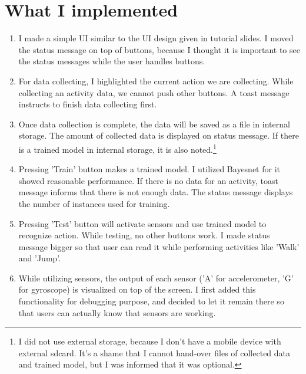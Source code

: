 \documentclass[11pt,a4paper]{article}
\begin{document}
	\section {What I implemented}
	\begin{enumerate}
		\item I made a simple UI similar to the UI design given in tutorial slides. I moved the status message on top of buttons, because I thought it is important to see the status messages while the user handles buttons. 
		
		\item For data collecting, I highlighted the current action we are collecting. While collecting an activity data, we cannot push other buttons. A toast message instructs to finish data collecting first.
		
		\item Once data collection is complete, the data will be saved as a file in internal storage. The amount of collected data is displayed on status message. If there is a trained model in internal storage, it is also noted.\footnote{I did not use external storage, because I don't have a mobile device with external sdcard. It's a shame that I cannot hand-over files of collected data and trained model, but I was informed that it was optional.}
		
		\item Pressing 'Train' button makes a trained model. I utilized Bayesnet for it showed reasonable performance. If there is no data for an activity, toast message informs that there is not enough data. The status message displays the number of instances used for training.
		
		\item Pressing 'Test' button will activate sensors and use trained model to recognize action. While testing, no other buttons work. I made status message bigger so that user can read it while performing activities like 'Walk' and 'Jump'.
		
		\item While utilizing sensors, the output of each sensor ('A' for accelerometer, 'G' for gyroscope) is visualized on top of the screen. I first added this functionality for debugging purpose, and decided to let it remain there so that users can actually know that sensors are working.
		
	\end{enumerate} 
\end{document}
